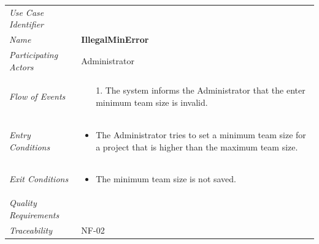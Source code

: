 \documentclass[12pt,letterpaper]{article}
\begin{document}
\begin{center}
	\begin{tabu} to 
		\toprule
		Use Case Identifier & \illegalminerror{} \\
		Name & {\bf IllegalMinError} \\
		Participating Actors & Administrator \\
		Flow of Events & 
		\begin{minipage}[t]{\linewidth}
		    \begin{enumerate}
			    \item[1.] The system informs the Administrator that the enter minimum team size is invalid.
			\end{enumerate}
        \end{minipage} \\

		Entry Conditions &
		\begin{minipage}[t]{\linewidth}
			\begin{itemize}
			    \item The Administrator tries to set a minimum team size for a project that is higher than the maximum team size.
	        \end{itemize}
        \end{minipage} \\

		Exit Conditions &
		\begin{minipage}[t]{\linewidth}
			\begin{itemize}
			    \item The minimum team size is not saved.
	        \end{itemize}
        \end{minipage} \\

		Quality Requirements & \\

		Traceability & NF-02 \\
		\toprule
	\end{tabu}
\end{center}
\end{document}
